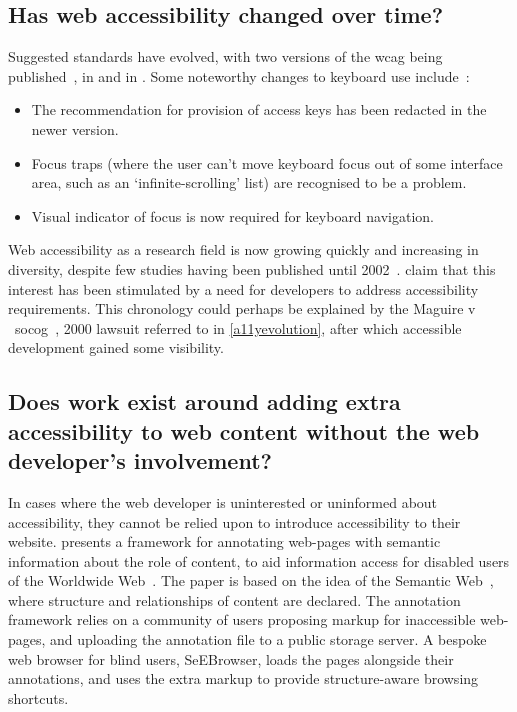 \documentclass[a4paper, 12pt]{report}
\begin{document}
\subsection{Has web accessibility changed over time?}
Suggested standards have evolved, with two versions of the \gls{wcag} being published~\cite{chisholm2001web,wcag}, in \citeyear{chisholm2001web} and in \citeyear{wcag}. Some noteworthy changes to keyboard use include~\cite{wcagcomparison}:
\begin{itemize}
\item The recommendation for provision of access keys has been redacted in the newer version.
\item Focus traps (where the user can't move keyboard focus out of some interface area, such as an `infinite-scrolling' list) are recognised to be a problem.
\item Visual indicator of focus is now required for keyboard navigation.
\end{itemize}

Web accessibility as a research field is now growing quickly and increasing in diversity, despite few studies having been published until 2002~\cite{freire2007techniques}. \citeauthor{freire2007techniques} claim that this interest has been stimulated by a need for developers to address accessibility requirements. This chronology could perhaps be explained by the Maguire v ~\gls{socog}~\cite{sloan2001web,russell2003access}, 2000 lawsuit referred to in \cref{a11yevolution}, after which accessible development gained some visibility.
\subsection{Does work exist around adding extra accessibility to web content without the web developer's involvement?}
\label{addingaccessibilityyourself}
In cases where the web developer is uninterested or uninformed about accessibility, they cannot be relied upon to introduce accessibility to their website. \citeauthor{kouroupetroglou2006semantic} presents a framework for annotating web-pages with semantic information about the role of content, to aid information access for disabled users of the Worldwide Web~\cite{kouroupetroglou2006semantic}. The paper is based on the idea of the Semantic Web~\cite{berners2001semantic}, where structure and relationships of content are declared. The annotation framework relies on a community of users proposing markup for inaccessible web-pages, and uploading the annotation file to a public storage server. A bespoke web browser for blind users, SeEBrowser, loads the pages alongside their annotations, and uses the extra markup to provide structure-aware browsing shortcuts.
\end{document}
